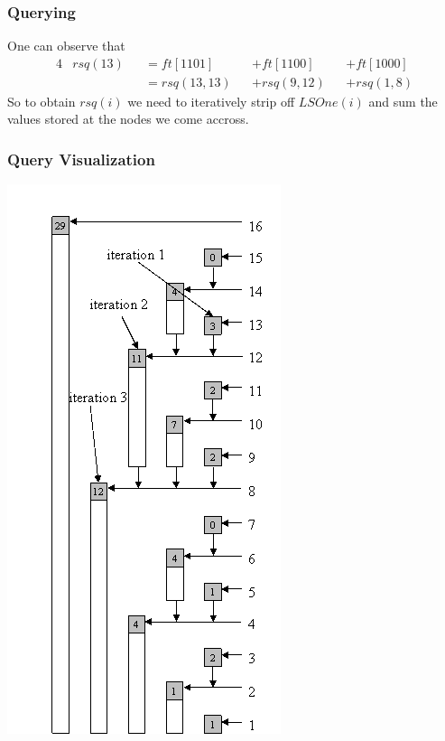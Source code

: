 \documentclass[12pt]{beamer}
\begin{document}
\begin{frame}
    \frametitle{Querying}
    One can observe that
    \begin{alignat*}{4}
        & rsq(13) &&= ft[1101] &&+ ft[1100] &&+ ft[1000] \\
        & &&= rsq(13, 13) &&+ rsq(9, 12) &&+ rsq(1, 8)
    \end{alignat*}
    So to obtain $rsq(i)$ we need to iteratively strip off $LSOne(i)$ and sum
    the values stored at the nodes we come accross.
\end{frame}

\begin{frame}
    \frametitle{Query Visualization}
    \begin{center}
        \includegraphics[width=\linewidth,height=.8\textheight,keepaspectratio]{img/query}
    \end{center}
\end{frame}
\end{document}
